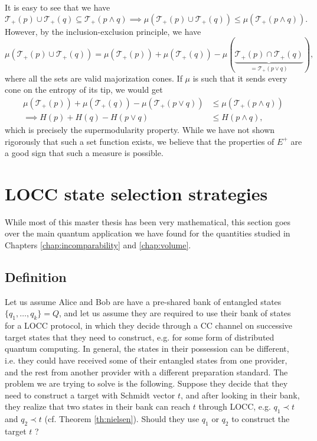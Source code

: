 It is easy to see that we have
\begin{equation}
    \mathcal{T}_+(p) \cup \mathcal{T}_+(q) \subseteq \mathcal{T}_+(p \wedge q) \implies \mu\left(\mathcal{T}_+(p) \cup \mathcal{T}_+(q)\right) \leq \mu\left(\mathcal{T}_+(p \wedge q)\right).
\end{equation}
\noindent However, by the inclusion-exclusion principle, we have 
\begin{equation}
    \mu\left(\mathcal{T}_+(p) \cup \mathcal{T}_+(q)\right) = \mu\left(\mathcal{T}_+(p)\right) + \mu\left(\mathcal{T}_+(q)\right) - \mu\left(\underbrace{\mathcal{T}_+(p) \cap \mathcal{T}_+(q)}_{= \mathcal{T}_+(p \vee q)}\right),
\end{equation}
\noindent where all the sets are valid majorization cones. If $\mu$ is such that it sends every cone on the entropy of its tip, we would get
\begin{align}
    \mu\left(\mathcal{T}_+(p)\right) + \mu\left(\mathcal{T}_+(q)\right) - \mu\left(\mathcal{T}_+(p \vee q)\right) &\leq \mu\left(\mathcal{T}_+(p \wedge q)\right)\\
    \implies H(p) + H(q) - H(p \vee q) &\leq H(p \wedge q),
\end{align}
\noindent which is precisely the supermodularity property. While we have not shown rigorously that such a set function exists, we believe that the properties of $E^+$ are a good sign that such a measure is possible.



\section{LOCC state selection strategies} \label{sec:strategies}

While most of this master thesis has been very mathematical, this section goes over the main quantum application we have found for the quantities studied in Chapters \ref{chap:incomparability} and \ref{chap:volume}.



\subsection{Definition}

Let us assume Alice and Bob are have a pre-shared bank of entangled states $\{q_1, \dots, q_k\} = Q$, and let us assume they are required to use their bank of states for a LOCC protocol, in which they decide through a CC channel on successive target states that they need to construct, e.g. for some form of distributed quantum computing. In general, the states in their possession can be different, i.e. they could have received some of their entangled states from one provider, and the rest from another provider with a different preparation standard. The problem we are trying to solve is the following. Suppose they decide that they need to construct a target with Schmidt vector $t$, and after looking in their bank, they realize that two states in their bank can reach $t$ through LOCC, e.g. $q_1 \prec t$ and $q_2 \prec t$ (cf. Theorem \ref{th:nielsen}). Should they use $q_1$ or $q_2$ to construct the target $t$ ?

